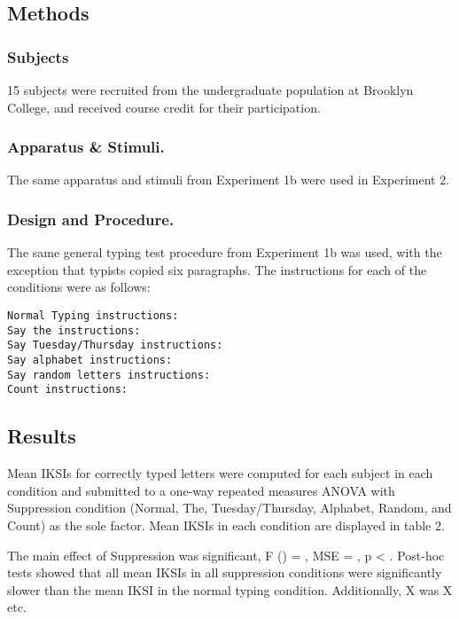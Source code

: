 \documentclass[floatsintext,man]{apa6}
\theoremstyle{definition}
\theoremstyle{definition}
\theoremstyle{definition}
\theoremstyle{remark}
\begin{document}
\subsection{Methods}\label{methods-1}

\subsubsection{Subjects}\label{subjects-1}

15 subjects were recruited from the undergraduate population at Brooklyn
College, and received course credit for their participation.

\subsubsection{Apparatus \& Stimuli.}\label{apparatus-stimuli.}

The same apparatus and stimuli from Experiment 1b were used in
Experiment 2.

\subsubsection{Design and Procedure.}\label{design-and-procedure.}

The same general typing test procedure from Experiment 1b was used, with
the exception that typists copied six paragraphs. The instructions for
each of the conditions were as follows:

\begin{verbatim}
Normal Typing instructions:
Say the instructions:
Say Tuesday/Thursday instructions:
Say alphabet instructions:
Say random letters instructions:
Count instructions:
\end{verbatim}

\subsection{Results}\label{results-1}

Mean IKSIs for correctly typed letters were computed for each subject in
each condition and submitted to a one-way repeated measures ANOVA with
Suppression condition (Normal, The, Tuesday/Thursday, Alphabet, Random,
and Count) as the sole factor. Mean IKSIs in each condition are
displayed in table 2.

The main effect of Suppression was significant, F () = , MSE = , p
\textless{} . Post-hoc tests showed that all mean IKSIs in all
suppression conditions were significantly slower than the mean IKSI in
the normal typing condition. Additionally, X was X etc.
\end{document}
